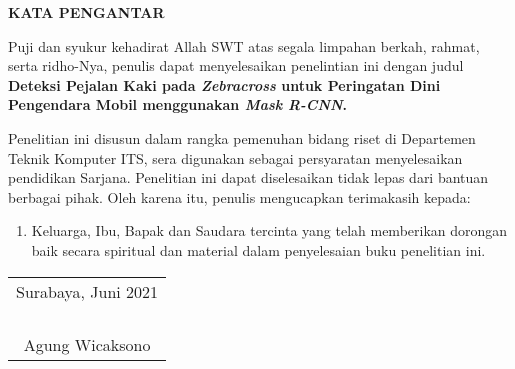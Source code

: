 \begin{center}
  \Large
  \textbf{KATA PENGANTAR}
\end{center}


\vspace{2ex}


Puji dan syukur kehadirat Allah SWT atas segala limpahan berkah, rahmat, serta ridho-Nya, penulis dapat menyelesaikan penelintian ini dengan judul \textbf{Deteksi Pejalan Kaki pada \textit{Zebracross} untuk Peringatan Dini Pengendara Mobil menggunakan \textit{Mask R-CNN}.}

Penelitian ini disusun dalam rangka pemenuhan bidang riset di Departemen Teknik Komputer ITS, sera digunakan sebagai persyaratan menyelesaikan pendidikan Sarjana. Penelitian ini dapat diselesaikan tidak lepas dari bantuan berbagai pihak. Oleh karena itu, penulis mengucapkan terimakasih kepada:

\begin{enumerate}[nolistsep]

  \item Keluarga, Ibu, Bapak dan Saudara tercinta yang telah memberikan dorongan baik secara spiritual dan material dalam penyelesaian buku penelitian ini. 

\end{enumerate}


\begin{flushright}
  \begin{tabular}[b]{c}
    Surabaya, Juni 2021\\
    \\
    \\
    \\
    \\
    Agung Wicaksono
  \end{tabular}
\end{flushright}
